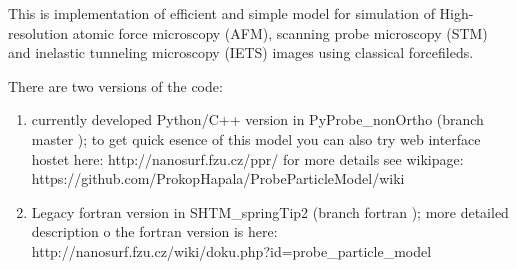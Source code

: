 This is implementation of efficient and simple model for simulation of
High-resolution atomic force microscopy (AFM), scanning probe microscopy (STM)
and inelastic tunneling microscopy (IETS) images using classical forcefileds. 

There are two versions of the code:

\begin{enumerate}
   \item currently developed Python/C++ version in PyProbe\_nonOrtho (branch master
    );
        to get quick esence of this model you can also try web interface hostet here: http://nanosurf.fzu.cz/ppr/
        for more details see wikipage:
        https://github.com/ProkopHapala/ProbeParticleModel/wiki
   \item Legacy fortran version in SHTM\_springTip2 (branch fortran );
        more detailed description o the fortran version is here:
        http://nanosurf.fzu.cz/wiki/doku.php?id=probe\_particle\_model 
\end{enumerate}

